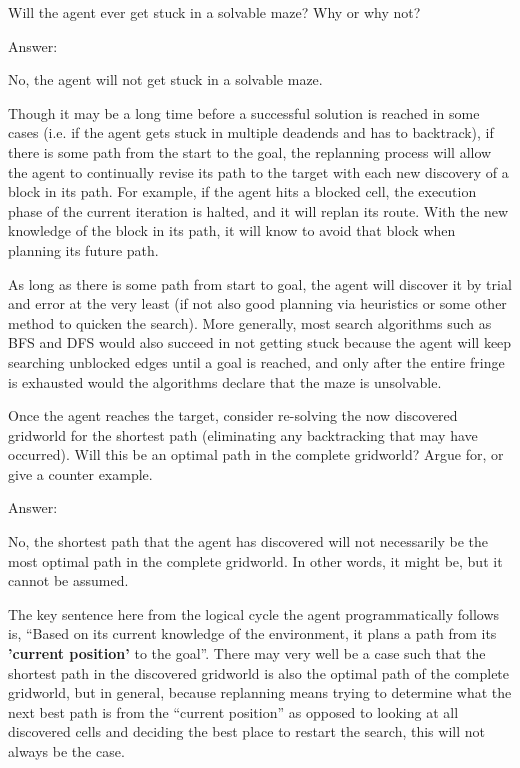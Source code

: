 \documentclass{homeworg}
\begin{document}
\newpage
\exercise*
Will the agent ever get stuck in a solvable maze? Why or why not?

Answer:

No, the agent will not get stuck in a solvable maze. 

Though it may be a long time before a successful solution is reached in some cases (i.e. if the agent gets stuck in multiple deadends and has to backtrack), if there is some path from the start to the goal, the replanning process will allow the agent to continually revise its path to the target with each new discovery of a block in its path. For example, if the agent hits a blocked cell, the execution phase of the current iteration is halted, and it will replan its route. With the new knowledge of the block in its path, it will know to avoid that block when planning its future path. 

As long as there is some path from start to goal, the agent will discover it by trial and error at the very least (if not also good planning via heuristics or some other method to quicken the search). More generally, most search algorithms such as BFS and DFS would also succeed in not getting stuck because the agent will keep searching unblocked edges until a goal is reached, and only after the entire fringe is exhausted would the algorithms declare that the maze is unsolvable.

\newpage
\exercise*
Once the agent reaches the target, consider re-solving the now discovered gridworld for the shortest path (eliminating any backtracking that may have occurred). Will this be an optimal path in the complete gridworld? Argue for, or give a counter example.

Answer:

No, the shortest path that the agent has discovered will not necessarily be the most optimal path in the complete gridworld. In other words, it might be, but it cannot be assumed.

The key sentence here from the logical cycle the agent programmatically follows is, “Based on its current knowledge of the environment, it plans a path from its \textbf{'current position'} to the goal”. There may very well be a case such that the shortest path in the discovered gridworld is also the optimal path of the complete gridworld, but in general, because replanning means trying to determine what the next best path is from the “current position” as opposed to looking at all discovered cells and deciding the best place to restart the search, this will not always be the case.
\end{document}
